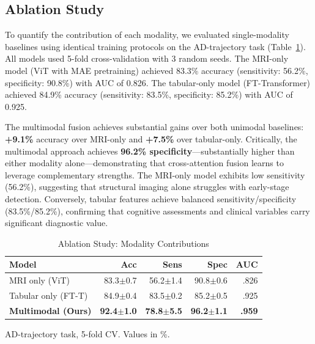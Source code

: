 \documentclass[conference]{IEEEtran}
\begin{document}
\subsection{Ablation Study}

To quantify the contribution of each modality, we evaluated single-modality baselines using identical training protocols on the AD-trajectory task (Table~\ref{tab:ablation}). All models used 5-fold cross-validation with 3 random seeds. The MRI-only model (ViT with MAE pretraining) achieved 83.3\% accuracy (sensitivity: 56.2\%, specificity: 90.8\%) with AUC of 0.826. The tabular-only model (FT-Transformer) achieved 84.9\% accuracy (sensitivity: 83.5\%, specificity: 85.2\%) with AUC of 0.925.

The multimodal fusion achieves substantial gains over both unimodal baselines: \textbf{+9.1\%} accuracy over MRI-only and \textbf{+7.5\%} over tabular-only. Critically, the multimodal approach achieves \textbf{96.2\% specificity}---substantially higher than either modality alone---demonstrating that cross-attention fusion learns to leverage complementary strengths. The MRI-only model exhibits low sensitivity (56.2\%), suggesting that structural imaging alone struggles with early-stage detection. Conversely, tabular features achieve balanced sensitivity/specificity (83.5\%/85.2\%), confirming that cognitive assessments and clinical variables carry significant diagnostic value.

\begin{table}[htbp]
\caption{Ablation Study: Modality Contributions}
\begin{center}
\small
\setlength{\tabcolsep}{4pt}
\begin{tabular}{@{}lrrrr@{}}
\toprule
\textbf{Model} & \textbf{Acc} & \textbf{Sens} & \textbf{Spec} & \textbf{AUC} \\
\midrule
MRI only (ViT) & 83.3$\pm$0.7 & 56.2$\pm$1.4 & 90.8$\pm$0.6 & .826 \\
Tabular only (FT-T) & 84.9$\pm$0.4 & 83.5$\pm$0.2 & 85.2$\pm$0.5 & .925 \\
\midrule
\textbf{Multimodal (Ours)} & \textbf{92.4$\pm$1.0} & \textbf{78.8$\pm$5.5} & \textbf{96.2$\pm$1.1} & \textbf{.959} \\
\bottomrule
\end{tabular}
\label{tab:ablation}
\end{center}
\vspace{-2mm}
{\scriptsize AD-trajectory task, 5-fold CV. Values in \%.}
\end{table}
\end{document}
